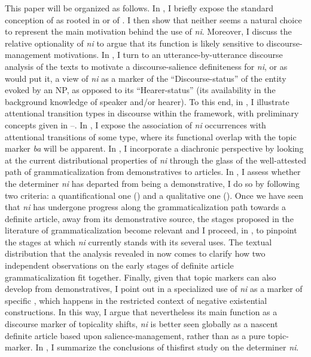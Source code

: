 \documentclass[output=paper
,modfonts
,nonflat]{langsci/langscibook}
\begin{document}
This paper will be organized as follows. In , I briefly expose the standard conception of  as rooted in  or  of . I then show that neither seems a natural choice to represent the main motivation behind the use of \textit{ni}. Moreover, I discuss the relative optionality of \textit{ni} to argue that its function is likely sensitive to discourse-management motivations. In , I turn to an utterance-by-utterance discourse analysis of the texts to motivate a discourse-salience definiteness for \textit{ni}, or as \citet{WalkerPrince1996} would put it, a view of \textit{ni} as a marker of the ``Discourse-status'' of the entity evoked by an NP, as opposed to its ``Hearer-status'' (its availability in the background knowledge of speaker and/or hearer). To this end, in , I illustrate attentional transition types in  discourse within the  framework, with preliminary concepts given in --. In , I expose the association of \textit{ni} occurrences with attentional transitions of some type, where its functional overlap with the topic marker \textit{ba} will be apparent. In , I incorporate a diachronic perspective by looking at the current distributional properties of \textit{ni} through the glass of the well-attested path of grammaticalization from demonstratives to articles. In , I assess whether the determiner \textit{ni} has departed from being a demonstrative, I do so by following two criteria: a quantificational one () and a qualitative one (). Once we have seen that \textit{ni} has undergone progress along the grammaticalization path towards a definite article, away from its demonstrative source, the stages proposed in the literature of grammaticalization become relevant and I proceed, in , to pinpoint the stages at which \textit{ni} currently stands with its several uses. The textual distribution that the  analysis revealed in  now comes to clarify how two independent observations on the early stages of definite article grammaticalization fit together. Finally, given that topic markers can also develop from demonstratives, I point out in  a specialized use of \textit{ni} as a marker of specific , which happens in the restricted context of negative existential constructions. In this way, I argue that nevertheless its main function as a discourse marker of topicality shifts, \textit{ni} is better seen globally as a nascent definite article based upon salience-management, rather than as a pure topic-marker. In , I summarize the conclusions of this\largerpage first study on the determiner \textit{ni}. 
\end{document}
